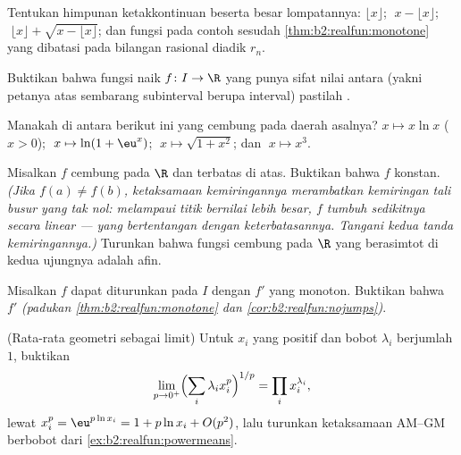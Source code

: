 \begin{exercise}[$\star$]\label{exo:b2:realfun:1}
Tentukan himpunan ketakkontinuan beserta besar lompatannya: $\lfloor x
\rfloor$; $\;x - \lfloor x\rfloor$; $\;\lfloor x \rfloor + \sqrt{x
- \lfloor x\rfloor}$; dan fungsi pada contoh sesudah
\cref{thm:b2:realfun:monotone} yang dibatasi pada bilangan rasional
diadik $r_n$.
\end{exercise}

\begin{exercise}[$\star$]\label{exo:b2:realfun:2}
Buktikan bahwa fungsi naik $f \colon I \to \R$ yang punya sifat nilai
antara (yakni petanya atas sembarang subinterval berupa interval)
pastilah .
\end{exercise}

\begin{exercise}[$\star$]\label{exo:b2:realfun:3}
Manakah di antara berikut ini yang cembung pada daerah asalnya? $x
\mapsto x\ln x$ ($x > 0$); $\;x \mapsto \ln(1 + \eu^x)$; $\;x \mapsto
\sqrt{1 + x^2}$; dan $\;x \mapsto x^3$.
\end{exercise}

\begin{exercise}[$\star\star$]\label{exo:b2:realfun:4}
Misalkan $f$ cembung pada $\R$ dan terbatas di atas. Buktikan bahwa $f$
konstan. \emph{(Jika $f(a) \neq f(b)$, ketaksamaan kemiringannya
merambatkan kemiringan tali busur yang tak nol: melampaui titik bernilai
lebih besar, $f$ tumbuh sedikitnya secara linear --- yang bertentangan
dengan keterbatasannya. Tangani kedua tanda kemiringannya.)} Turunkan
bahwa fungsi cembung pada $\R$ yang berasimtot di kedua ujungnya adalah afin.
\end{exercise}

\begin{exercise}[$\star\star$]\label{exo:b2:realfun:5}
Misalkan $f$ dapat diturunkan pada $I$ dengan $f'$ yang monoton.
Buktikan bahwa $f'$  \emph{(padukan
\cref{thm:b2:realfun:monotone} dan
\cref{cor:b2:realfun:nojumps})}.
\end{exercise}

\begin{exercise}[$\star\star$]\label{exo:b2:realfun:6}
(Rata-rata geometri sebagai limit) Untuk $x_i$ yang positif dan bobot
$\lambda_i$ berjumlah $1$, buktikan
\[
\lim_{p \to 0^+} \Bigl(\sum_i \lambda_i x_i^p\Bigr)^{1/p}
= \prod_i x_i^{\lambda_i} ,
\]
lewat $x_i^p = \eu^{p\ln x_i} = 1 + p\ln x_i + O(p^2)$, lalu turunkan
ketaksamaan AM--GM berbobot dari
\cref{ex:b2:realfun:powermeans}.
\end{exercise}

